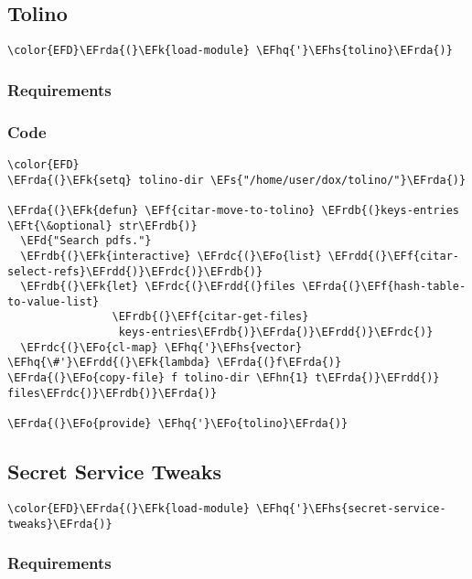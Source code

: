 \documentclass[a4wide,10pt]{article}
\newcommand{\EFs}[1]{\textcolor{EFs}{#1}} %
\newcommand{\EFd}[1]{\textcolor{EFd}{#1}} %
\newcommand{\EFk}[1]{\textcolor{EFk}{#1}} %
\newcommand{\EFf}[1]{\textcolor{EFf}{#1}} %
\newcommand{\EFt}[1]{\textcolor{EFt}{#1}} %
\newcommand{\EFo}[1]{\textcolor{EFo}{#1}} %
\newcommand{\EFhn}[1]{\textcolor{EFhn}{\textbf{#1}}} %
\newcommand{\EFhq}[1]{\textcolor{EFhq}{#1}} %
\newcommand{\EFhs}[1]{\textcolor{EFhs}{#1}} %
\newcommand{\EFrda}[1]{\textcolor{EFrda}{#1}} %
\newcommand{\EFrdb}[1]{\textcolor{EFrdb}{#1}} %
\newcommand{\EFrdc}[1]{\textcolor{EFrdc}{#1}} %
\newcommand{\EFrdd}[1]{\textcolor{EFrdd}{#1}} %
\begin{document}
\subsection{Tolino}
\label{sec:orgfa5a8a1}
\begin{Code}
\begin{Verbatim}
\color{EFD}\EFrda{(}\EFk{load-module} \EFhq{'}\EFhs{tolino}\EFrda{)}
\end{Verbatim}
\end{Code}
\subsubsection{Requirements}
\label{sec:orgf498802}
\subsubsection{Code}
\label{sec:org2a14b23}
\begin{Code}
\begin{Verbatim}
\color{EFD}
\EFrda{(}\EFk{setq} tolino-dir \EFs{"/home/user/dox/tolino/"}\EFrda{)}

\EFrda{(}\EFk{defun} \EFf{citar-move-to-tolino} \EFrdb{(}keys-entries \EFt{\&optional} str\EFrdb{)}
  \EFd{"Search pdfs."}
  \EFrdb{(}\EFk{interactive} \EFrdc{(}\EFo{list} \EFrdd{(}\EFf{citar-select-refs}\EFrdd{)}\EFrdc{)}\EFrdb{)}
  \EFrdb{(}\EFk{let} \EFrdc{(}\EFrdd{(}files \EFrda{(}\EFf{hash-table-to-value-list}
                \EFrdb{(}\EFf{citar-get-files}
                 keys-entries\EFrdb{)}\EFrda{)}\EFrdd{)}\EFrdc{)}
  \EFrdc{(}\EFo{cl-map} \EFhq{'}\EFhs{vector} \EFhq{\#'}\EFrdd{(}\EFk{lambda} \EFrda{(}f\EFrda{)} \EFrda{(}\EFo{copy-file} f tolino-dir \EFhn{1} t\EFrda{)}\EFrdd{)} files\EFrdc{)}\EFrdb{)}\EFrda{)}

\EFrda{(}\EFo{provide} \EFhq{'}\EFo{tolino}\EFrda{)}
\end{Verbatim}
\end{Code}
\subsection{Secret Service Tweaks}
\label{sec:orgac448a5}
\begin{Code}
\begin{Verbatim}
\color{EFD}\EFrda{(}\EFk{load-module} \EFhq{'}\EFhs{secret-service-tweaks}\EFrda{)}
\end{Verbatim}
\end{Code}
\subsubsection{Requirements}
\label{sec:org1ab011e}
\end{document}

